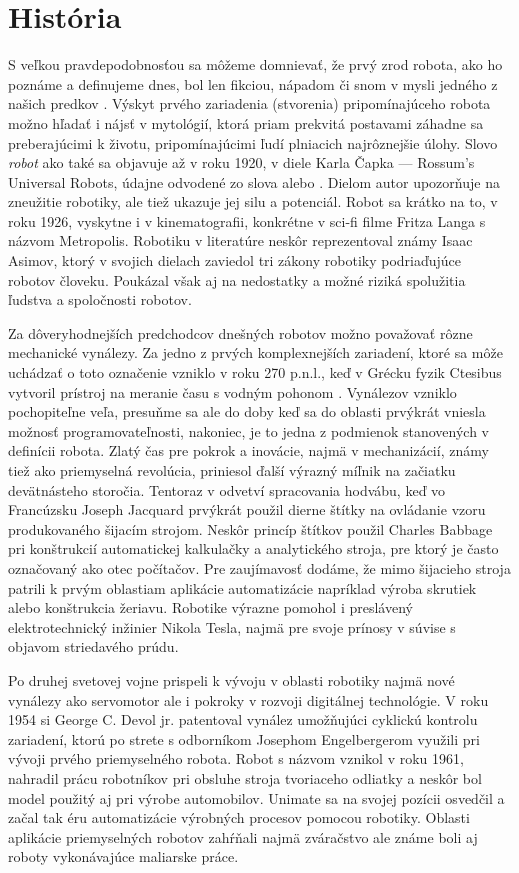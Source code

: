 \section{História}
S veľkou pravdepodobnosťou sa môžeme domnievať, že prvý zrod robota, ako ho poznáme a definujeme dnes, bol len fikciou, nápadom či snom v mysli jedného z našich predkov \cite{RoboticsAndAutomationHandbook}. Výskyt prvého zariadenia (stvorenia) pripomínajúceho robota možno hľadať i nájsť v mytológií, ktorá priam prekvitá postavami záhadne sa preberajúcimi k životu, pripomínajúcimi ľudí plniacich najrôznejšie úlohy. Slovo \textit{robot} ako také sa objavuje až v roku 1920, v diele Karla Čapka --- Rossum's Universal Robots, údajne odvodené zo slova  alebo . Dielom autor upozorňuje na zneužitie robotiky, ale tiež ukazuje jej silu a potenciál. Robot sa krátko na to, v roku 1926, vyskytne i v kinematografii, konkrétne v sci-fi filme Fritza Langa s názvom Metropolis. Robotiku v literatúre neskôr reprezentoval známy Isaac Asimov, ktorý v svojich dielach zaviedol tri zákony robotiky podriaďujúce robotov človeku. Poukázal však aj na nedostatky a možné riziká spolužitia ľudstva a spoločnosti robotov.

Za dôveryhodnejších predchodcov dnešných robotov možno považovať rôzne mechanické vynálezy. Za jedno z prvých komplexnejších zariadení, ktoré sa môže uchádzať o toto označenie vzniklo v roku 270 p.n.l., keď v Grécku fyzik Ctesibus vytvoril prístroj na meranie času s vodným pohonom \cite{RoboticsAndAutomationHandbook}. Vynálezov vzniklo pochopiteľne veľa, presuňme sa ale do doby keď sa do oblasti prvýkrát vniesla možnosť programovateľnosti, nakoniec, je to jedna z podmienok stanovených v definícii robota. Zlatý čas pre pokrok a inovácie, najmä v mechanizácií, známy tiež ako priemyselná revolúcia, priniesol ďalší výrazný míľnik na začiatku devätnásteho storočia. Tentoraz v odvetví spracovania hodvábu, keď vo Francúzsku Joseph Jacquard prvýkrát použil dierne štítky na ovládanie vzoru produkovaného šijacím strojom. Neskôr princíp štítkov použil Charles Babbage pri konštrukcií automatickej kalkulačky a analytického stroja, pre ktorý je často označovaný ako otec počítačov. Pre zaujímavosť dodáme, že mimo šijacieho stroja patrili k prvým oblastiam aplikácie automatizácie napríklad výroba skrutiek alebo konštrukcia žeriavu. Robotike výrazne pomohol i preslávený elektrotechnický inžinier Nikola Tesla, najmä pre svoje prínosy v súvise s objavom striedavého prúdu.

Po druhej svetovej vojne prispeli k vývoju v oblasti robotiky najmä nové vynálezy ako servomotor ale i pokroky v rozvoji digitálnej technológie. V roku 1954 si George C. Devol jr. patentoval vynález umožňujúci cyklickú kontrolu zariadení, ktorú po strete s odborníkom Josephom Engelbergerom využili pri vývoji prvého priemyselného robota. Robot s názvom  vznikol v roku 1961, nahradil prácu robotníkov pri obsluhe stroja tvoriaceho odliatky a neskôr bol model použitý aj pri výrobe automobilov. Unimate sa na svojej pozícii osvedčil a začal tak éru automatizácie výrobných procesov pomocou robotiky. Oblasti aplikácie priemyselných robotov zahŕňali najmä zváračstvo ale známe boli aj roboty vykonávajúce maliarske práce.

